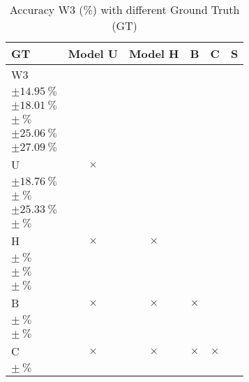 \begin{table}[H]
\small
\centering
\caption{\label{tab:base3dRPEdatamask}%
  Accuracy W3 (\%) with different Ground Truth (GT)
}
\begin{tabular}{lccccc}
  \toprule
  GT & Model U                                                         & Model H                                                         & B                                                     & C                                                               & S \\
  \midrule
  W3 & \makecell{$\SI{83.97}{\percent}$ \\ $\pm \SI{14.95}{\percent}$} & \makecell{$\SI{22.57}{\percent}$ \\ $\pm \SI{18.01}{\percent}$} & \makecell{$\SI{}{\percent}$ \\ $\pm \SI{}{\percent}$} & \makecell{$\SI{49.53}{\percent}$ \\ $\pm \SI{25.06}{\percent}$} & \makecell{$\SI{30.18}{\percent}$ \\ $\pm \SI{27.09}{\percent}$} \\
  U & $\times$                                                         & \makecell{$\SI{23.91}{\percent}$ \\ $\pm \SI{18.76}{\percent}$} & \makecell{$\SI{}{\percent}$ \\ $\pm \SI{}{\percent}$} & \makecell{$\SI{51.75}{\percent}$ \\ $\pm \SI{25.33}{\percent}$} & \makecell{$\SI{}{\percent}$ \\ $\pm \SI{}{\percent}$} \\
  H & $\times$                                                         & $\times$                                                        & \makecell{$\SI{}{\percent}$ \\ $\pm \SI{}{\percent}$} & \makecell{$\SI{}{\percent}$ \\ $\pm \SI{}{\percent}$}           & \makecell{$\SI{}{\percent}$ \\ $\pm \SI{}{\percent}$} \\
  B & $\times$                                                         & $\times$                                                        & $\times$                                              & \makecell{$\SI{}{\percent}$ \\ $\pm \SI{}{\percent}$}           & \makecell{$\SI{}{\percent}$ \\ $\pm \SI{}{\percent}$} \\
  C & $\times$                                                         & $\times$                                                        & $\times$                                              & $\times$                                                        & \makecell{$\SI{}{\percent}$ \\ $\pm \SI{}{\percent}$} \\

\end{tabular}
\end{table}
